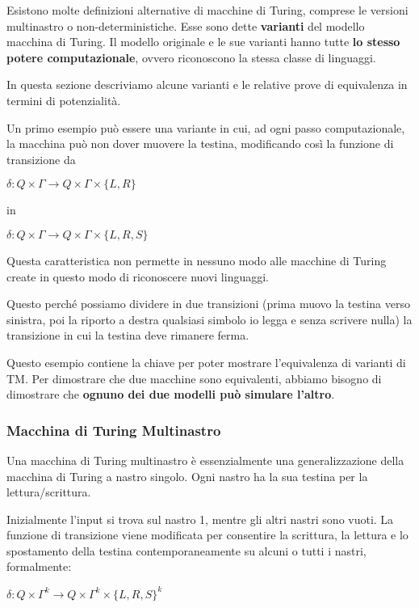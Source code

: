 \documentclass{article}
\begin{document}
Esistono molte definizioni alternative di macchine di Turing, comprese le
versioni multinastro o non-deterministiche. Esse sono dette \textbf{varianti}
del modello macchina di Turing. Il modello originale e le sue varianti hanno
tutte \textbf{lo stesso potere computazionale}, ovvero riconoscono la stessa
classe di linguaggi.

In questa sezione descriviamo alcune varianti e le relative prove di equivalenza
in termini di potenzialità.

\noindent Un primo esempio può essere una variante in cui, ad ogni passo
computazionale, la macchina può non dover muovere la testina, modificando così
la funzione di transizione da

\begin{center}
    $\delta: Q \times \Gamma \rightarrow Q \times \Gamma \times \{L, R\}$

    in

    $\delta: Q \times \Gamma \rightarrow Q \times \Gamma \times \{L, R, S\}$
\end{center}

Questa caratteristica non permette in nessuno modo alle macchine di Turing
create in questo modo di riconoscere nuovi linguaggi.

Questo perché possiamo dividere in due transizioni (prima muovo la testina verso
sinistra, poi la riporto a destra qualsiasi simbolo io legga e senza scrivere
nulla) la transizione in cui la testina deve rimanere ferma.

Questo esempio contiene la chiave per poter mostrare l'equivalenza di varianti
di TM. Per dimostrare che due macchine sono equivalenti, abbiamo bisogno di
dimostrare che \textbf{ognuno dei due modelli può simulare l'altro}.

\subsubsection{Macchina di Turing Multinastro}

Una macchina di Turing multinastro è essenzialmente una generalizzazione della
macchina di Turing a nastro singolo. Ogni nastro ha la sua testina per la
lettura/scrittura.

Inizialmente l'input si trova sul nastro 1, mentre gli altri nastri sono vuoti.
La funzione di transizione viene modificata per consentire la scrittura, la
lettura e lo spostamento della testina contemporaneamente su alcuni o tutti i
nastri, formalmente:

\begin{center}
    $\delta: Q \times \Gamma^k \rightarrow Q \times \Gamma^k \times \{L, R,
    S\}^k$
\end{center}
\end{document}
